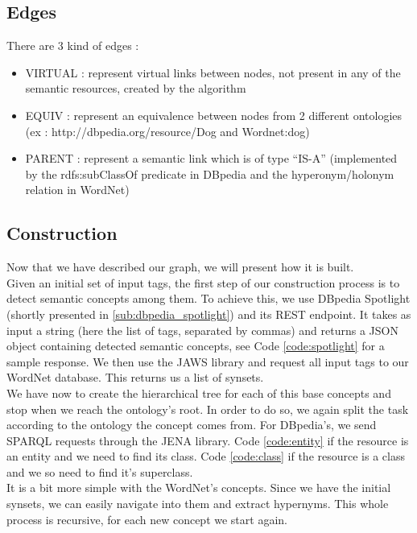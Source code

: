 \subsection{Edges} %
\label{sub:edges}
There are 3 kind of edges :
\begin{itemize}
	\item VIRTUAL : represent virtual links between nodes, not present in any of the semantic resources, created by the algorithm
	\item EQUIV : represent an equivalence between nodes from 2 different ontologies \\
	(ex : http://dbpedia.org/resource/Dog and Wordnet:dog)
	\item PARENT : represent a semantic link which is of type “IS-A” (implemented by the rdfs:subClassOf predicate in DBpedia and the hyperonym/holonym relation in WordNet)
\end{itemize}

\subsection{Construction} %
\label{sub:construction}
Now that we have described our graph, we will present how it is built.\\

Given an initial set of input tags, the first step of our construction process is to detect semantic concepts among them. To achieve this, we use DBpedia Spotlight (shortly presented in \ref{sub:dbpedia_spotlight}) and its REST endpoint. It takes as input a string (here the list of tags, separated by commas) and returns a JSON object containing detected semantic concepts, see Code \ref{code:spotlight} for a sample response. We then use the JAWS library and request all input tags to our WordNet database. This returns us a list of synsets.\\


We have now to create the hierarchical tree for each of this base concepts and stop when we reach the ontology's root. In order to do so, we again split the task according to the ontology the concept comes from. For DBpedia's, we send SPARQL requests through the JENA library. Code \ref{code:entity} if the resource is an entity and we need to find its class. Code \ref{code:class} if the resource is a class and we so need to find it's superclass.\\


It is a bit more simple with the WordNet's concepts. Since we have the initial synsets, we can easily navigate into them and extract hypernyms. This whole process is recursive, for each new concept we start again.\\

